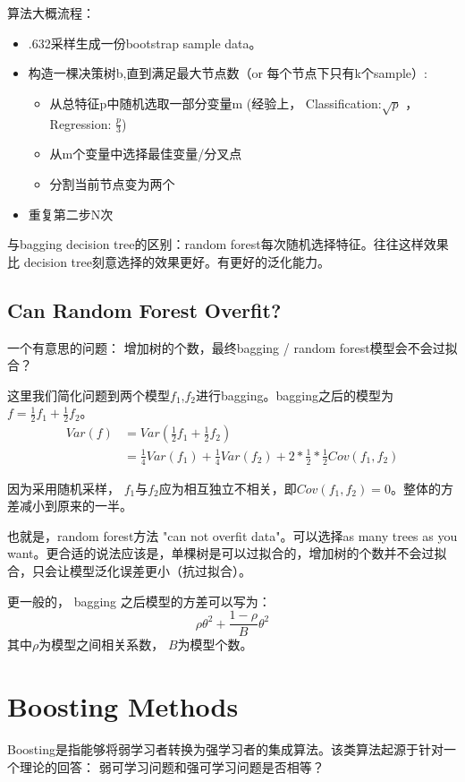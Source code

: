 \documentclass[12pt,a4paper,oneside]{article}
\begin{document}
\begin{CJK*}{UTF8}{gbsn}
算法大概流程：
\begin{itemize}
\item .632采样生成一份bootstrap sample data。
\item 构造一棵决策树b,直到满足最大节点数（or 每个节点下只有k个sample）:
\begin{itemize}
\item 从总特征p中随机选取一部分变量m (经验上， Classification:$\sqrt{p}$ ， Regression: $\frac{p}{3}$)
\item 从m个变量中选择最佳变量/分叉点
\item 分割当前节点变为两个
\end{itemize}
\item 重复第二步N次
\end{itemize}

与bagging decision tree的区别：random forest每次随机选择特征。往往这样效果比 decision tree刻意选择的效果更好。有更好的泛化能力。

\subsection{Can Random Forest Overfit? }
一个有意思的问题： 增加树的个数，最终bagging / random forest模型会不会过拟合？

这里我们简化问题到两个模型$f_{1}$,$f_{2}$进行bagging。bagging之后的模型为
$f=\frac{1}{2}f_{1}+\frac{1}{2}f_{2}$。
\begin{align*}
Var(f)&= Var(\frac{1}{2}f_{1}+\frac{1}{2}f_{2}) \\
&= \frac{1}{4}Var(f_{1})+\frac{1}{4}Var(f_{2})+2*\frac{1}{2}*\frac{1}{2}Cov(f_{1},f_{2})
\end{align*}

因为采用随机采样， $f_{1}$与$f_{2}$应为相互独立不相关，即$Cov(f_{1},f_{2})=0$。整体的方差减小到原来的一半。

也就是，random forest方法 "can not overfit data"。可以选择as many trees as you want。更合适的说法应该是，单棵树是可以过拟合的，增加树的个数并不会过拟合，只会让模型泛化误差更小（抗过拟合）。

更一般的， bagging 之后模型的方差可以写为：
$$\rho\theta^{2} + \frac{1-\rho}{B}\theta^{2} $$
其中$\rho$为模型之间相关系数， $B$为模型个数。 

\section{Boosting Methods}
Boosting是指能够将弱学习者转换为强学习者的集成算法。该类算法起源于针对一个理论的回答： 弱可学习问题和强可学习问题是否相等？


\end{CJK*}
\end{document}
